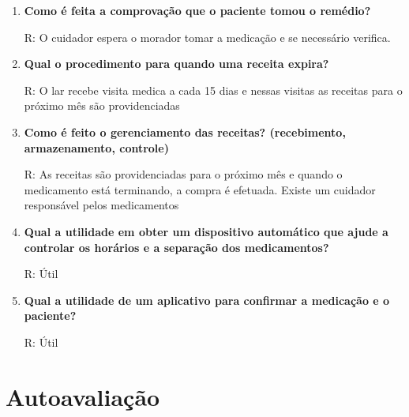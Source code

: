 \begin{apendicesenv}
\begin{enumerate}
    \item \textbf{Como é feita a comprovação que o paciente tomou o remédio?}
    
    R: O cuidador espera o morador tomar a medicação e se necessário verifica.
    
    \item \textbf{Qual o procedimento para quando uma receita expira?}
    
    R: O lar recebe visita medica a cada 15 dias e nessas visitas as receitas para o próximo mês são providenciadas
    
    \item \textbf{Como é feito o gerenciamento das receitas? (recebimento, armazenamento, controle)}
    
    R: As receitas são providenciadas para o próximo mês e quando o medicamento está terminando, a compra é efetuada. Existe um cuidador responsável pelos medicamentos
    
    \item \textbf{Qual a utilidade em obter um dispositivo automático que ajude a controlar os horários e a separação dos medicamentos?}
    
    R: Útil 
    
    \item \textbf{Qual a utilidade de um aplicativo para confirmar a medicação e o paciente?}
    
    R: Útil 
\end{enumerate}


\chapter{Autoavaliação}


\end{apendicesenv}

